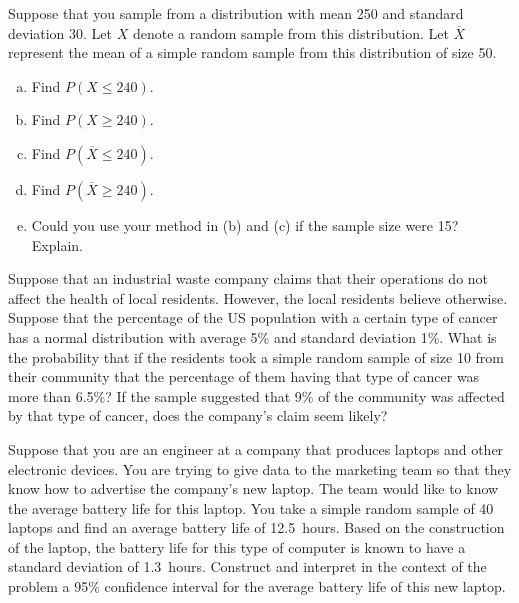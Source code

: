 \documentclass[11pt,letterpaper]{article}
\begin{document}

 Suppose that you sample from a distribution with mean 250 and standard deviation 30. Let $X$ denote a random sample from this distribution. Let $\overline{X}$ represent the mean of a simple random sample from this distribution of size 50.
	\begin{enumerate}[(a)]
	\item Find $P(X \leq 240)$.
	\item Find $P(X \geq 240)$.
	\item Find $P(\overline{X} \leq 240)$.
	\item Find $P(\overline{X} \geq 240)$.
	\item Could you use your method in (b) and (c) if the sample size were 15? Explain. 
	\end{enumerate}



\newpage



 Suppose that an industrial waste company claims that their operations do not affect the health of local residents. However, the local residents believe otherwise. Suppose that the percentage of the US population with a certain type of cancer has a normal distribution with average 5\% and standard deviation 1\%. What is the probability that if the residents took a simple random sample of size 10 from their community that the percentage of them having that type of cancer was more than 6.5\%? If the sample suggested that 9\% of the community was affected by that type of cancer, does the company's claim seem likely? 



\newpage



 Suppose that you are an engineer at a company that produces laptops and other electronic devices. You are trying to give data to the marketing team so that they know how to advertise the company's new laptop. The team would like to know the average battery life for this laptop. You take a simple random sample of 40 laptops and find an average battery life of 12.5~hours. Based on the construction of the laptop, the battery life for this type of computer is known to have a standard deviation of 1.3~hours. Construct and interpret in the context of the problem a 95\% confidence interval for the average battery life of this new laptop. 
\end{document}
